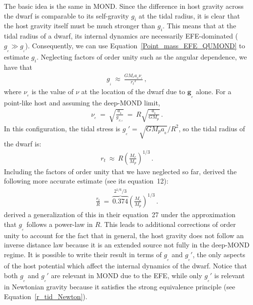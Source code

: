 \documentclass[fleqn,usenatbib,useAMS]{mnras} %
\begin{document}
The basic idea is the same in MOND. Since the difference in host gravity across the dwarf is comparable to its self-gravity $g_i$ at the tidal radius, it is clear that the host gravity itself must be much stronger than $g_i$. This means that at the tidal radius of a dwarf, its internal dynamics are necessarily EFE-dominated ($g_{_e} \gg g_{_i}$). Consequently, we can use Equation~\ref{Point_mass_EFE_QUMOND} to estimate $g_i$. Neglecting factors of order unity such as the angular dependence, we have that
\begin{eqnarray}
	g_{_i} ~\approx~ \frac{GM_c a_{_0}\nu_{_e}}{{r_t}^2} \, ,
\end{eqnarray}
where $\nu_{_e}$ is the value of $\nu$ at the location of the dwarf due to $\bm{g}_{_e}$ alone. For a point-like host and assuming the deep-MOND limit,
\begin{eqnarray}
	\nu_{_e} ~=~ \sqrt{\frac{a_{_0}}{g_{_{N,e}}}} ~=~ R\sqrt{\frac{a_{_0}}{GM_p}} \, .
\end{eqnarray}
In this configuration, the tidal stress is $g_{_e}' = \sqrt{GM_p a_{_0}}/R^2$, so the tidal radius of the dwarf is:
\begin{eqnarray}
	r_t ~\approx~ R \left(\frac{M_c}{M_p} \right)^{1/3} \, .
\end{eqnarray}
Including the factors of order unity that we have neglected so far, \citet{Zhao_2005} derived the following more accurate estimate (see its equation~12):
\begin{eqnarray}
	\frac{r_t}{R} ~=~ \overbrace{0.374}^{2^{1/6}/3} \left(\frac{M_c}{M_p}\right)^{1/3} \, .
	\label{r_tid_DML}
\end{eqnarray}
\citet{Zhao_2006} derived a generalization of this in their equation~27 under the approximation that $g_{_e}$ follows a power-law in $R$. This leads to additional corrections of order unity to account for the fact that in general, the host gravity does not follow an inverse distance law because it is an extended source not fully in the deep-MOND regime. It is possible to write their result in terms of $g_{_e}$ and $g_{_e}'$, the only aspects of the host potential which affect the internal dynamics of the dwarf. Notice that both $g_{_e}$ and $g_{_e}'$ are relevant in MOND due to the EFE, while only $g_{_e}'$ is relevant in Newtonian gravity because it satisfies the strong equivalence principle (see Equation~\ref{r_tid_Newton}).
\end{document}
